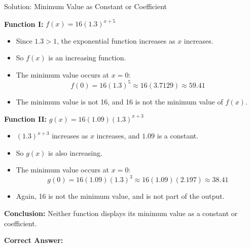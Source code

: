 \documentclass{beamer}
\begin{document}
\begin{frame}{Solution: Minimum Value as Constant or Coefficient}
\footnotesize

\textbf{Function I:} $f(x) = 16(1.3)^{x + 5}$
\begin{itemize}
    \item Since $1.3 > 1$, the exponential function increases as $x$ increases.
    \item So $f(x)$ is an increasing function.
    \item The minimum value occurs at $x = 0$:
    \[
    f(0) = 16(1.3)^5 \approx 16(3.7129) \approx 59.41
    \]
    \item The minimum value is not 16, and 16 is not the minimum value of $f(x)$.
\end{itemize}

\vspace{0.1cm}
\textbf{Function II:} $g(x) = 16(1.09)(1.3)^{x + 3}$
\begin{itemize}
    \item $(1.3)^{x + 3}$ increases as $x$ increases, and $1.09$ is a constant.
    \item So $g(x)$ is also increasing.
    \item The minimum value occurs at $x = 0$:
    \[
    g(0) = 16(1.09)(1.3)^3 \approx 16(1.09)(2.197) \approx 38.41
    \]
    \item Again, 16 is not the minimum value, and is not part of the output.
\end{itemize}

\vspace{0.1cm}
\textbf{Conclusion:} Neither function displays its minimum value as a constant or coefficient.

\textbf{Correct Answer:} 

\end{frame}
\end{document}
